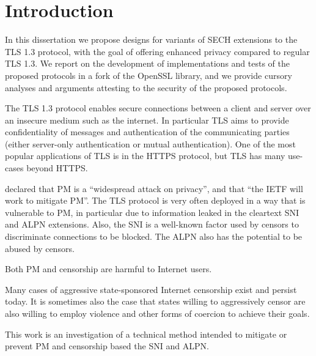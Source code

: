 \chapter{Introduction}


In this dissertation we propose designs
for variants of \ac{SECH} extensions
to the \ac{TLS} 1.3 protocol,
with the goal of offering enhanced
privacy compared to regular \ac{TLS} 1.3.
We report on the development
of implementations and tests of the proposed protocols
in a fork of the OpenSSL library,
and we provide cursory analyses and arguments
attesting to the security of the
proposed protocols.

The \ac{TLS} 1.3 protocol enables secure connections between
a client and server over an insecure medium such as the internet.
In particular \ac{TLS} aims to provide confidentiality of messages
and authentication of the communicating parties (either server-only authentication
or mutual authentication). One of the most popular applications of \ac{TLS} is
in the \ac{HTTPS} protocol, but \ac{TLS} has many use-cases beyond \ac{HTTPS}.

\cite{rfc7258-pervasive-monitoring} declared that \ac{PM} is a ``widespread attack on privacy'', and
that ``the \ac{IETF} will work to mitigate \ac{PM}''.
The \ac{TLS} protocol is very often
deployed in a way that is vulnerable
to \ac{PM}, in particular due to
information leaked in the cleartext \ac{SNI} and
\ac{ALPN} extensions.
Also, the \ac{SNI} is a well-known factor used
by censors to discriminate connections to be blocked. The \ac{ALPN} also has the potential
to be abused by censors.

Both \ac{PM} and censorship are harmful to Internet users.

Many cases of aggressive state-sponsored Internet censorship exist and persist today.
It is sometimes also the case that states willing to aggressively censor are also willing to employ violence and other forms of coercion to achieve their goals.




This work is an investigation of a technical method
intended to mitigate or prevent \ac{PM} and censorship
based the \ac{SNI} and \ac{ALPN}.


